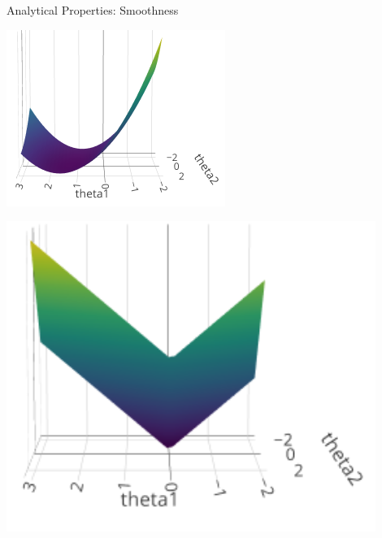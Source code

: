 \documentclass[11pt,compress,t,notes=noshow, xcolor=table]{beamer}
\begin{document}
\begin{vbframe}{Analytical Properties: Smoothness}
\begin{minipage}[c]{0.3\textwidth}
  \includegraphics[width=\textwidth]{figure/lasso_unpenalized}
\end{minipage}%
\begin{minipage}[c]{0.05\textwidth}
  \phantom{foo}
\end{minipage}%
\begin{minipage}[c]{0.3\textwidth}
  \includegraphics[width=0.9\textwidth]{figure/lasso_penalty}
\end{minipage}%
\begin{minipage}[c]{0.05\textwidth}
  \phantom{foo}
\end{minipage}%

\end{vbframe}
\end{document}
